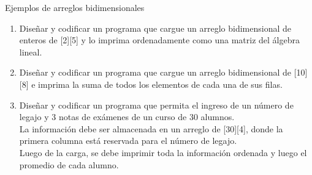 \documentclass[xcolor=pdftex,table,11pt]{beamer}
\begin{document}
\begin{frame}{Ejemplos de arreglos bidimensionales}
 \begin{enumerate}
   
        \item Diseñar y codificar un programa que cargue un arreglo bidimensional de enteros de [2][5] y lo imprima ordenadamente como una matriz del álgebra lineal.
\href{https://github.com/danis963/informaticaI_IUA/blob/main/c/src/8-3arrays.c}{}

        \item Diseñar y codificar un programa que cargue un arreglo bidimensional de [10][8] e imprima la suma de todos los elementos de cada una de sus filas.
                
\href{https://github.com/danis963/informaticaI_IUA/blob/main/c/src/5-break_cont_1.c}{}


        \item Diseñar y codificar un programa que permita el ingreso de un número de legajo y 3 notas de exámenes de un curso de 30 alumnos. \\
        La información debe ser almacenada en un arreglo de [30][4], donde la primera columna está reservada para el número de legajo.\\
        Luego de la carga, se debe imprimir toda la información ordenada y luego el promedio de cada alumno.
\href{https://github.com/danis963/informaticaI_IUA/blob/main/c/src/5-break_cont_1.c}{}

   \end{enumerate}
\end{frame}
\end{document}
